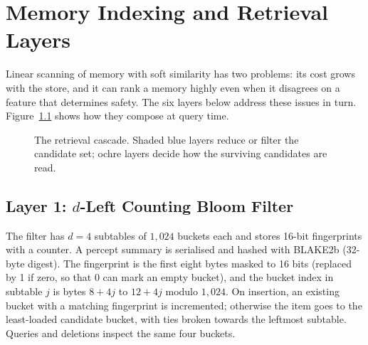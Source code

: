 \documentclass[12pt,a4paper,oneside]{report}
\begin{document}
\chapter{Memory Indexing and Retrieval Layers}\label{ch:index}
Linear scanning of memory with soft similarity has two problems: its cost grows with the store, and it can rank a memory highly even when it disagrees on a feature that determines safety. The six layers below address these issues in turn. Figure~\ref{fig:cascade} shows how they compose at query time.

\begin{figure}[H]
\centering
{}
\caption{The retrieval cascade. Shaded blue layers reduce or filter the candidate set; ochre layers decide how the surviving candidates are read.}
\label{fig:cascade}
\end{figure}

\section{Layer 1: $d$-Left Counting Bloom Filter}
The filter has $d = 4$ subtables of $1{,}024$ buckets each and stores 16-bit fingerprints with a counter. A percept summary is serialised and hashed with BLAKE2b (32-byte digest). The fingerprint is the first eight bytes masked to 16 bits (replaced by 1 if zero, so that 0 can mark an empty bucket), and the bucket index in subtable $j$ is bytes $8+4j$ to $12+4j$ modulo $1{,}024$. On insertion, an existing bucket with a matching fingerprint is incremented; otherwise the item goes to the least-loaded candidate bucket, with ties broken towards the leftmost subtable. Queries and deletions inspect the same four buckets.
\end{document}
